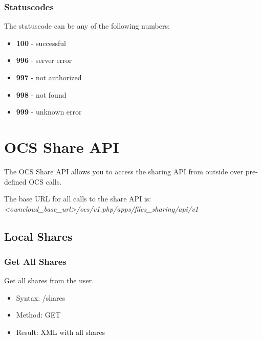 \documentclass[letterpaper,10pt,english]{sphinxmanual}
\begin{document}
\subsubsection{Statuscodes}
\label{core/externalapi:statuscodes}
The statuscode can be any of the following numbers:
\begin{itemize}
\item {} 
\textbf{100} - successful

\item {} 
\textbf{996} - server error

\item {} 
\textbf{997} - not authorized

\item {} 
\textbf{998} - not found

\item {} 
\textbf{999} - unknown error

\end{itemize}


\section{OCS Share API}
\label{core/ocs-share-api:ocs-share-api}\label{core/ocs-share-api::doc}
The OCS Share API allows you to access the sharing API from outside over
pre-defined OCS calls.

The base URL for all calls to the share API is: \emph{\textless{}owncloud\_base\_url\textgreater{}/ocs/v1.php/apps/files\_sharing/api/v1}


\subsection{Local Shares}
\label{core/ocs-share-api:local-shares}

\subsubsection{Get All Shares}
\label{core/ocs-share-api:get-all-shares}
Get all shares from the user.
\begin{itemize}
\item {} 
Syntax: /shares

\item {} 
Method: GET

\item {} 
Result: XML with all shares

\end{itemize}
\end{document}
